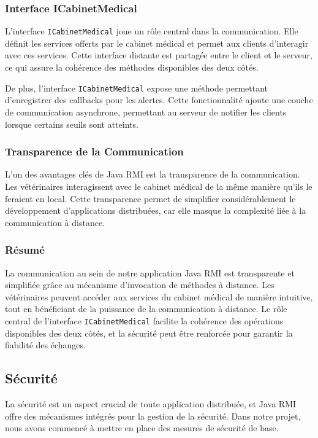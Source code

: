 \documentclass{article} %
\begin{document}
\subsubsection{Interface ICabinetMedical}

L'interface \texttt{ICabinetMedical} joue un rôle central dans la communication. Elle définit les services offerts par le cabinet médical et permet aux clients d'interagir avec ces services. Cette interface distante est partagée entre le client et le serveur, ce qui assure la cohérence des méthodes disponibles des deux côtés.

De plus, l'interface \texttt{ICabinetMedical} expose une méthode permettant d'enregistrer des callbacks pour les alertes. Cette fonctionnalité ajoute une couche de communication asynchrone, permettant au serveur de notifier les clients lorsque certains seuils sont atteints.

\subsubsection{Transparence de la Communication}

L'un des avantages clés de Java RMI est la transparence de la communication. Les vétérinaires interagissent avec le cabinet médical de la même manière qu'ils le feraient en local. Cette transparence permet de simplifier considérablement le développement d'applications distribuées, car elle masque la complexité liée à la communication à distance.

\subsubsection{Résumé}

La communication au sein de notre application Java RMI est transparente et simplifiée grâce au mécanisme d'invocation de méthodes à distance. Les vétérinaires peuvent accéder aux services du cabinet médical de manière intuitive, tout en bénéficiant de la puissance de la communication à distance. Le rôle central de l'interface \texttt{ICabinetMedical} facilite la cohérence des opérations disponibles des deux côtés, et la sécurité peut être renforcée pour garantir la fiabilité des échanges.


\subsection{Sécurité}

La sécurité est un aspect crucial de toute application distribuée, et Java RMI offre des mécanismes intégrés pour la gestion de la sécurité. Dans notre projet, nous avons commencé à mettre en place des mesures de sécurité de base.
\end{document}
